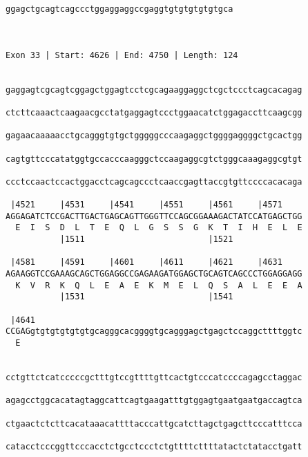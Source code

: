 \documentclass{article}
\begin{document}
\begin{Verbatim}
ggagctgcagtcagccctggaggaggccgaggtgtgtgtgtgtgca
                                              
                                              
 
Exon 33 | Start: 4626 | End: 4750 | Length: 124


gaggagtcgcagtcggagctggagtcctcgcagaaggaggctcgctccctcagcacagag
                                                            
ctcttcaaactcaagaacgcctatgaggagtccctggaacatctggagaccttcaagcgg
                                                            
gagaacaaaaacctgcagggtgtgctgggggcccaagaggctggggaggggctgcactgg
                                                            
cagtgttcccatatggtgccacccaagggctccaagaggcgtctgggcaaagaggcgtgt
                                                            
ccctccaactccactggacctcagcagccctcaaccgagttaccgtgttccccacacaga
                                                            
 |4521     |4531     |4541     |4551     |4561     |4571    
AGGAGATCTCCGACTTGACTGAGCAGTTGGGTTCCAGCGGAAAGACTATCCATGAGCTGG
  E  I  S  D  L  T  E  Q  L  G  S  S  G  K  T  I  H  E  L  E
           |1511                         |1521              
  
 |4581     |4591     |4601     |4611     |4621     |4631    
AGAAGGTCCGAAAGCAGCTGGAGGCCGAGAAGATGGAGCTGCAGTCAGCCCTGGAGGAGG
  K  V  R  K  Q  L  E  A  E  K  M  E  L  Q  S  A  L  E  E  A
           |1531                         |1541              
  
 |4641                                                      
CCGAGgtgtgtgtgtgtgcagggcacggggtgcagggagctgagctccaggcttttggtc
  E                                                         
                                                            
  
cctgttctcatcccccgctttgtccgttttgttcactgtcccatccccagagcctaggac
                                                            
agagcctggcacatagtaggcattcagtgaagatttgtggagtgaatgaatgaccagtca
                                                            
ctgaactctcttcacataaacattttacccattgcatcttagctgagcttcccatttcca
                                                            
catacctcccggttcccacctctgcctccctctgttttcttttatactctatacctgatt
                                                            

\end{Verbatim}
\end{document}
